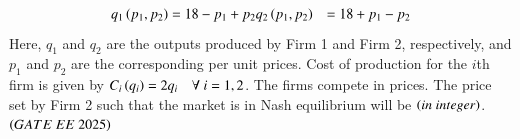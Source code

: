 \documentclass[journal,12pt,onecolumn]{IEEEtran}
\theoremstyle{remark}
\begin{document}
\begin{enumerate}
\begin{align*}
q_1\left(p_1, p_2\right) &= 18 - p_1 + p_2  
q_2\left(p_1, p_2\right) &= 18 + p_1 - p_2
\end{align*}
Here, $q_1$ and $q_2$ are the outputs produced by Firm 1 and Firm 2, respectively, and $p_1$ and $p_2$ are the corresponding per unit prices. Cost of production for the $i$th firm is given by $C_i\left(q_i\right) = 2q_i \quad \forall~i=1,2$. The firms compete in prices. The price set by Firm 2 such that the market is in Nash equilibrium will be \underline{\hspace{2cm}} $\left(in\ integer\right)$. 
 \hfill $\left(GATE\ EE\ 2025\right)$
\end{enumerate}
\renewcommand{\thefigure}{\theenumi}
\renewcommand{\thetable}{\theenumi}
\end{document}

